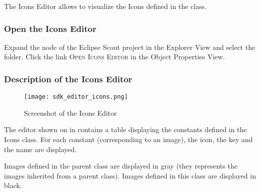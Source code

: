 %

The Icons Editor allows to visualize the Icons defined in the  class. 

\subsubsection*{Open the Icons Editor}

Expand the  node of the Eclipse Scout project in the Explorer View and select the  folder. Click the link \textsc{Open Icons Editor} in the Object Properties View. 

\subsubsection*{Description of the Icons Editor}

\begin{figure}
\texttt{[image: sdk\_editor\_icons.png]}
\caption{Screenshot of the Icons Editor}
\end{figure}

The editor shown on in  contains a table displaying the constants defined in the Icons class. For each constant (corresponding to an image), the icon, the key and the name are displayed.

Images defined in the parent class are displayed in gray (they represents the images inherited from a parent class). Images defined in this class are displayed in black.


